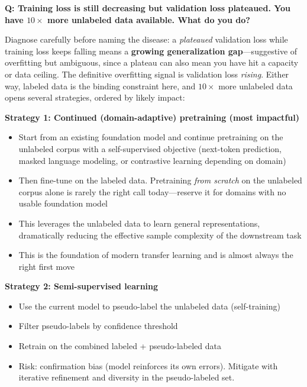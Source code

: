 \begin{interviewq}
\textbf{Q: Training loss is still decreasing but validation loss plateaued. You have $10\times$ more unlabeled data available. What do you do?}

 \quad {} \quad \badgefreq{\freqmed}

\stronganswer
Diagnose carefully before naming the disease: a \textit{plateaued} validation loss while training loss keeps falling means a \textbf{growing generalization gap}---suggestive of overfitting but ambiguous, since a plateau can also mean you have hit a capacity or data ceiling. The definitive overfitting signal is validation loss \textit{rising}. Either way, labeled data is the binding constraint here, and $10\times$ more unlabeled data opens several strategies, ordered by likely impact:

\textbf{Strategy 1: Continued (domain-adaptive) pretraining (most impactful)}
\begin{itemize}
    \item Start from an existing foundation model and continue pretraining on the unlabeled corpus with a self-supervised objective (next-token prediction, masked language modeling, or contrastive learning depending on domain)
    \item Then fine-tune on the labeled data. Pretraining \textit{from scratch} on the unlabeled corpus alone is rarely the right call today---reserve it for domains with no usable foundation model
    \item This leverages the unlabeled data to learn general representations, dramatically reducing the effective sample complexity of the downstream task
    \item This is the foundation of modern transfer learning and is almost always the right first move
\end{itemize}

\textbf{Strategy 2: Semi-supervised learning}
\begin{itemize}
    \item Use the current model to pseudo-label the unlabeled data (self-training)
    \item Filter pseudo-labels by confidence threshold
    \item Retrain on the combined labeled + pseudo-labeled data
    \item Risk: confirmation bias (model reinforces its own errors). Mitigate with iterative refinement and diversity in the pseudo-labeled set.
\end{itemize}


\end{interviewq}

